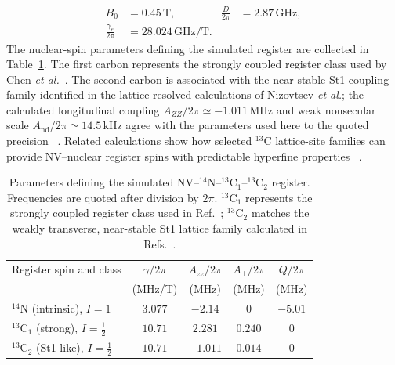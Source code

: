 \documentclass[
  aps,
  pra,
  reprint,            %
  superscriptaddress, %
  amsmath,amssymb,
  notitlepage
]{revtex4-2}
\begin{document}
\begin{equation}
\begin{aligned}
B_0&=0.45\,\mathrm{T},
&\frac{D}{2\pi}&=2.87\,\mathrm{GHz},\\
\frac{\gamma_e}{2\pi}&=28.024\,\mathrm{GHz/T}.
\end{aligned}
\label{eq:electronic_register_parameters}
\end{equation}
The nuclear-spin parameters defining the simulated register are
collected in Table~\ref{tab:nv_register_parameters}. The first carbon
represents the strongly coupled register class used by Chen
\emph{et al.}~\cite{Chen}. The second carbon is associated with the
near-stable St1 coupling family identified in the lattice-resolved
calculations of Nizovtsev \emph{et al.}; the calculated longitudinal
coupling $A_{ZZ}/2\pi\simeq-1.011\,\mathrm{MHz}$ and weak
nonsecular scale $A_{\mathrm{nd}}/2\pi\simeq14.5\,\mathrm{kHz}$ agree
with the parameters used here to the quoted precision
~\cite{nizovtsev2018nonflipping}. Related calculations show how
selected $^{13}\mathrm C$ lattice-site families can provide
NV--nuclear register spins with predictable hyperfine properties
~\cite{nizovtsev2021hyperfine}.

\begin{table}[t]
\centering
\caption{Parameters defining the simulated
NV--$^{14}\mathrm N$--$^{13}\mathrm C_1$--$^{13}\mathrm C_2$
register. Frequencies are quoted after division by $2\pi$.
$^{13}\mathrm C_1$ represents the strongly coupled register class
used in Ref.~\cite{Chen}; $^{13}\mathrm C_2$ matches the weakly
transverse, near-stable St1 lattice family calculated in
Refs.~\cite{nizovtsev2018nonflipping,nizovtsev2021hyperfine}.}
\label{tab:nv_register_parameters}
\scriptsize
\setlength{\tabcolsep}{3.0pt}
\renewcommand{\arraystretch}{1.10}
\begin{tabular}{@{}lcccc@{}}
\toprule
Register spin and class
& $\gamma/2\pi$
& $A_{zz}/2\pi$
& $A_{\perp}/2\pi$
& $Q/2\pi$ \\
& (MHz/T) & (MHz) & (MHz) & (MHz) \\
\midrule
$^{14}\mathrm N$ (intrinsic), $I=1$
& $3.077$ & $-2.14$ & $0$ & $-5.01$ \\
$^{13}\mathrm C_1$ (strong), $I=\tfrac12$
& $10.71$ & $2.281$ & $0.240$ & $0$ \\
$^{13}\mathrm C_2$ (St1-like), $I=\tfrac12$
& $10.71$ & $-1.011$ & $0.014$ & $0$ \\
\bottomrule
\end{tabular}
\end{table}
\end{document}
